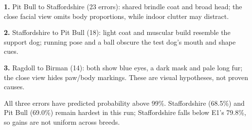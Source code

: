 \textbf{1.} Pit Bull to Staffordshire (23 errors): shared brindle coat and broad head; the close facial view omits body proportions, while indoor clutter may distract.

\textbf{2.} Staffordshire to Pit Bull (18): light coat and muscular build resemble the support dog; running pose and a ball obscure the test dog's mouth and shape cues.

\textbf{3.} Ragdoll to Birman (14): both show blue eyes, a dark mask and pale long fur; the close view hides paw/body markings. These are visual hypotheses, not proven causes.

All three errors have predicted probability above 99\%. Staffordshire (68.5\%) and Pit Bull (69.0\%) remain hardest in this run; Staffordshire falls below E1's 79.8\%, so gains are not uniform across breeds.
